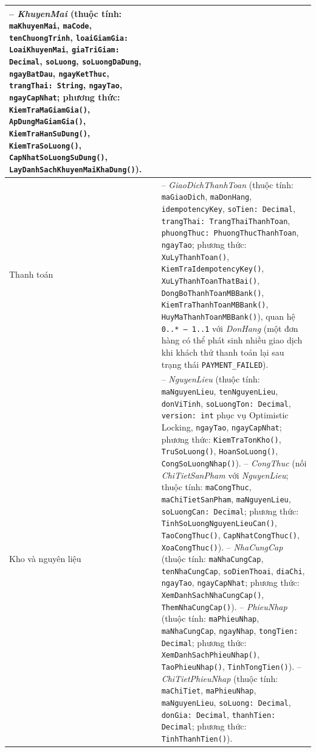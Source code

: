 \documentclass[12pt,a4paper]{report}
\begin{document}
\begin{longtable}{>{\raggedright\arraybackslash}p{3.8cm}>{\raggedright\arraybackslash}p{11.4cm}}
-- \textit{KhuyenMai} (thuộc tính: \texttt{maKhuyenMai}, \texttt{maCode}, \texttt{tenChuongTrinh}, \texttt{loaiGiamGia: LoaiKhuyenMai}, \texttt{giaTriGiam: Decimal}, \texttt{soLuong}, \texttt{soLuongDaDung}, \texttt{ngayBatDau}, \texttt{ngayKetThuc}, \texttt{trangThai: String}, \texttt{ngayTao}, \texttt{ngayCapNhat}; phương thức: \texttt{KiemTraMaGiamGia()}, \texttt{ApDungMaGiamGia()}, \texttt{KiemTraHanSuDung()}, \texttt{KiemTraSoLuong()}, \texttt{CapNhatSoLuongSuDung()}, \texttt{LayDanhSachKhuyenMaiKhaDung()}). \\
\hline
Thanh toán & -- \textit{GiaoDichThanhToan} (thuộc tính: \texttt{maGiaoDich}, \texttt{maDonHang}, \texttt{idempotencyKey}, \texttt{soTien: Decimal}, \texttt{trangThai: TrangThaiThanhToan}, \texttt{phuongThuc: PhuongThucThanhToan}, \texttt{ngayTao}; phương thức: \texttt{XuLyThanhToan()}, \texttt{KiemTraIdempotencyKey()}, \texttt{XuLyThanhToanThatBai()}, \texttt{DongBoThanhToanMBBank()}, \texttt{KiemTraThanhToanMBBank()}, \texttt{HuyMaThanhToanMBBank()}), quan hệ \texttt{0..* -- 1..1} với \textit{DonHang} (một đơn hàng có thể phát sinh nhiều giao dịch khi khách thử thanh toán lại sau trạng thái \texttt{PAYMENT\_FAILED}). \\
\hline
Kho và nguyên liệu & -- \textit{NguyenLieu} (thuộc tính: \texttt{maNguyenLieu}, \texttt{tenNguyenLieu}, \texttt{donViTinh}, \texttt{soLuongTon: Decimal}, \texttt{version: int} phục vụ Optimistic Locking, \texttt{ngayTao}, \texttt{ngayCapNhat}; phương thức: \texttt{KiemTraTonKho()}, \texttt{TruSoLuong()}, \texttt{HoanSoLuong()}, \texttt{CongSoLuongNhap()}). \newline
-- \textit{CongThuc} (nối \textit{ChiTietSanPham} với \textit{NguyenLieu}; thuộc tính: \texttt{maCongThuc}, \texttt{maChiTietSanPham}, \texttt{maNguyenLieu}, \texttt{soLuongCan: Decimal}; phương thức: \texttt{TinhSoLuongNguyenLieuCan()}, \texttt{TaoCongThuc()}, \texttt{CapNhatCongThuc()}, \texttt{XoaCongThuc()}). \newline
-- \textit{NhaCungCap} (thuộc tính: \texttt{maNhaCungCap}, \texttt{tenNhaCungCap}, \texttt{soDienThoai}, \texttt{diaChi}, \texttt{ngayTao}, \texttt{ngayCapNhat}; phương thức: \texttt{XemDanhSachNhaCungCap()}, \texttt{ThemNhaCungCap()}). \newline
-- \textit{PhieuNhap} (thuộc tính: \texttt{maPhieuNhap}, \texttt{maNhaCungCap}, \texttt{ngayNhap}, \texttt{tongTien: Decimal}; phương thức: \texttt{XemDanhSachPhieuNhap()}, \texttt{TaoPhieuNhap()}, \texttt{TinhTongTien()}). \newline
-- \textit{ChiTietPhieuNhap} (thuộc tính: \texttt{maChiTiet}, \texttt{maPhieuNhap}, \texttt{maNguyenLieu}, \texttt{soLuong: Decimal}, \texttt{donGia: Decimal}, \texttt{thanhTien: Decimal}; phương thức: \texttt{TinhThanhTien()}). \\

\end{longtable}
\end{document}
